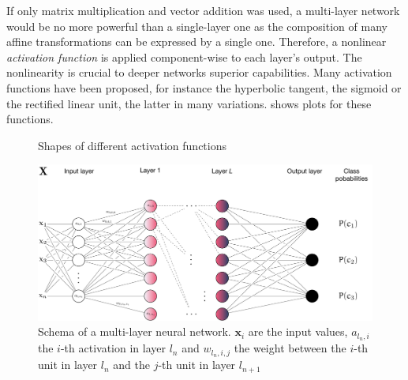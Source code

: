 If only matrix multiplication and vector addition was used, a multi-layer network would be no more
powerful than a single-layer one as the composition of many affine
transformations can be expressed by a single one. Therefore, a nonlinear
\emph{activation function} is applied component-wise to each layer's output. The
nonlinearity is crucial to deeper networks superior capabilities. Many
activation functions have been proposed, for instance the hyperbolic tangent,
the sigmoid or the rectified linear unit, the latter in many variations.
 shows plots for these functions.

\begin{figure}
    \centering
    \caption{Shapes of different activation functions}
    \label{fig:activation_functions}
\end{figure}

\begin{figure}
    \hypertarget{fig:neuralnet}{%
        \centering
        \includegraphics[max width=\textwidth]{gfx/diagrams/neural_network/neural_net.pdf}
        \caption[Schema of a multi-layer neural network]{Schema of a multi-layer neural network. \(\mathbf{x}_i\) are
            the input values, \(a_{l_n,i}\) the \(i\)-th activation in layer \(l_n\)
            and \(w_{l_n,i,j}\) the weight between the \(i\)-th unit in layer
        \(l_n\) and the \(j\)-th unit in layer \(l_{n+1}\)}\label{fig:neuralnet}
    }
\end{figure}

